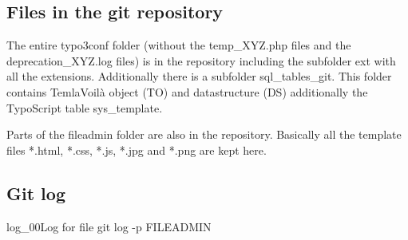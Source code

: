 \subsection{Files in the git repository}
The entire typo3conf folder (without the temp\_XYZ.php files and the deprecation\_XYZ.log files) is in the repository including the subfolder ext with all the extensions. Additionally there is a subfolder sql\_tables\_git. This folder contains TemlaVoilà object (TO) and datastructure (DS) additionally the TypoScript table sys\_template.

Parts of the fileadmin folder are also in the repository. Basically all the template files *.html, *.css, *.js, *.jpg and *.png are kept here.
\subsection{Git log}
\begin{codelisting}{log_00}{Log for file}
git log -p FILEADMIN
\end{codelisting}
\nopagebreak[4]
